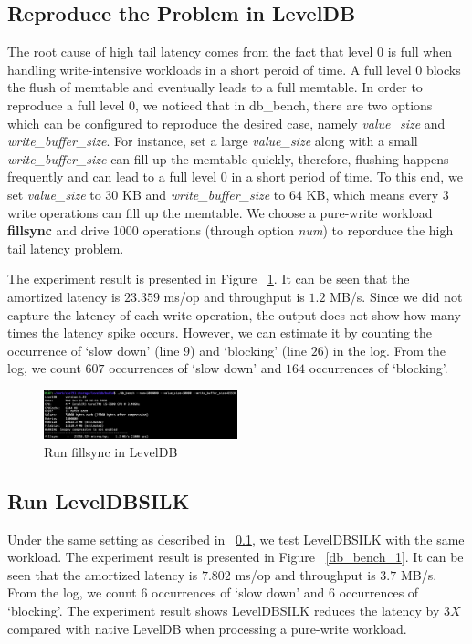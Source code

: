 \documentclass[letter,twocolumn,10pt]{article}
\begin{document}
\subsection {Reproduce the Problem in LevelDB}
\label{sec:reproduce}

The root cause of high tail latency comes from the fact that level 0 is full when handling write-intensive workloads in a short peroid of time. A full level 0 blocks the flush of memtable and eventually leads to a full memtable. In order to reproduce a full level $0$, we noticed that in \textsf{db\_bench}, there are two options which can be configured to reproduce the desired case, namely \textit{value\_size} and \textit{write\_buffer\_size}. For instance, set a large \textit{value\_size} along with a small \textit{write\_buffer\_size} can fill up the memtable quickly, therefore, flushing happens frequently and can lead to a full level $0$ in a short period of time. To this end, we set \textit{value\_size} to $30$ KB and \textit{write\_buffer\_size} to $64$ KB, which means every 3 write operations can fill up the memtable. We choose a pure-write workload \textbf{fillsync} and drive 1000 operations (through option \textit{num}) to reporduce the high tail latency problem.

The experiment result is presented in Figure ~\ref{db_bench}. It can be seen that the amortized latency is $23.359$ ms/op and throughput is $1.2$ MB/s. Since we did not capture the latency of each write operation, the output does not show how many times the latency spike occurs. However, we can estimate it by counting the occurrence of `slow down' (line $9$) and `blocking' (line $26$) in the log. From the log, we count $607$ occurrences of `slow down' and $164$ occurrences of `blocking'.  

\begin{figure}[H]
\centering
\includegraphics[width=0.5\textwidth]{./db_bench_leveldb.png}
\caption{Run fillsync in LevelDB}
\label{db_bench}
\end{figure}

\subsection {Run LevelDBSILK}
Under the same setting as described in ~\ref{sec:reproduce}, we test LevelDBSILK with the same workload. The experiment result is presented in Figure ~\ref{db_bench_1}. It can be seen that the amortized latency is $7.802$ ms/op and throughput is $3.7$ MB/s. From the log, we count $6$ occurrences of `slow down' and $6$ occurrences of `blocking'. The experiment result shows LevelDBSILK reduces the latency by $3X$ compared with native LevelDB when processing a pure-write workload.  
\end{document}
